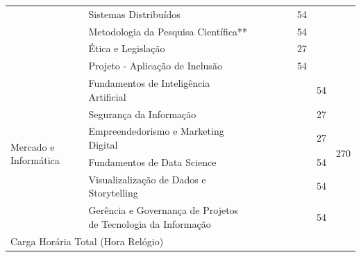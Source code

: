 \documentclass[11pt,fleqn]{book} %
\begin{document}
\begin{table}[]
{\begin{tabular}{|l|l|c|c|c|c|c|c|c|}
			& Sistemas Distribuídos                                         &                 &                 &                 &                 & 54              &                 &                      \\ \cline{2-8}
			& Metodologia da Pesquisa Científica**                          &                 &                 &                 &                 & 54              &                 &                      \\ \cline{2-8}
			& Ética e Legislação                                            &                 &                 &                 &                 & 27              &                 &                      \\ \cline{2-8}
			& Projeto - Aplicação de Inclusão                               &                 &                 &                 &                 & 54              &                 &                      \\ \hline
			\multirow{6}{*}{Mercado e Informática}                           
			& Fundamentos de Inteligência Artificial                        &                 &                 &                 &                 &                 & 54              & \multirow{6}{*}{270} \\ \cline{2-8}
			& Segurança da Informação                                       &                 &                 &                 &                 &                 & 27              &                      \\ \cline{2-8}
			& Empreendedorismo e Marketing Digital                          &                 &                 &                 &                 &                 & 27              &                      \\ \cline{2-8}
			& Fundamentos de Data Science                                   &                 &                 &                 &                 &                 & 54              &                      \\ \cline{2-8}
			& Visualizalização de Dados e Storytelling                      &                 &                 &                 &                 &                 & 54              &                      \\ \cline{2-8}
			& Gerência e Governança de Projetos de Tecnologia da Informação &                 &                 &                 &                 &                 & 54              &                      \\ \hline
			\multicolumn{8}{|l|}{Carga Horária Total (Hora Relógio)}                                                                                                                                                                                     

\end{tabular}}
\end{table}
\end{document}

